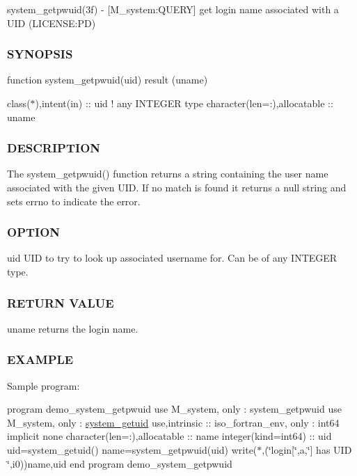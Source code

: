 system\+\_\+getpwuid(3f) -\/ \mbox{[}M\+\_\+system\+:Q\+U\+E\+RY\mbox{]} get login name associated with a U\+ID (L\+I\+C\+E\+N\+SE\+:PD) \subsubsection*{S\+Y\+N\+O\+P\+S\+IS}

function system\+\_\+getpwuid(uid) result (uname)

class($\ast$),intent(in) \+:\+: uid ! any I\+N\+T\+E\+G\+ER type character(len=\+:),allocatable \+:\+: uname

\subsubsection*{D\+E\+S\+C\+R\+I\+P\+T\+I\+ON}

\begin{DoxyVerb}The system_getpwuid() function returns a string containing the user
name associated with the given UID. If no match is found it returns
a null string and sets errno to indicate the error.
\end{DoxyVerb}


\subsubsection*{O\+P\+T\+I\+ON}

uid U\+ID to try to look up associated username for. Can be of any I\+N\+T\+E\+G\+ER type.

\subsubsection*{R\+E\+T\+U\+RN V\+A\+L\+UE}

uname returns the login name.

\subsubsection*{E\+X\+A\+M\+P\+LE}

Sample program\+:

program demo\+\_\+system\+\_\+getpwuid use M\+\_\+system, only \+: system\+\_\+getpwuid use M\+\_\+system, only \+: \mbox{\hyperlink{interfacem__system_1_1system__getuid}{system\+\_\+getuid}} use,intrinsic \+:\+: iso\+\_\+fortran\+\_\+env, only \+: int64 implicit none character(len=\+:),allocatable \+:\+: name integer(kind=int64) \+:\+: uid uid=system\+\_\+getuid() name=system\+\_\+getpwuid(uid) write($\ast$,\textquotesingle{}(\char`\"{}login\mbox{[}\char`\"{},a,\char`\"{}\mbox{]} has U\+I\+D \char`\"{},i0)\textquotesingle{})name,uid end program demo\+\_\+system\+\_\+getpwuid

